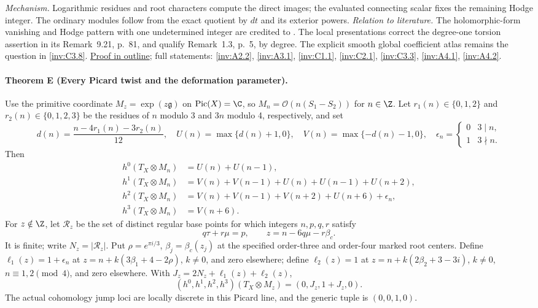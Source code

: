 \textit{Mechanism.} Logarithmic residues and root characters
compute the direct images; the evaluated connecting scalar fixes
the remaining Hodge integer.  The ordinary modules follow from
the exact quotient by $dt$ and its exterior powers.
\textit{Relation to literature.} The holomorphic-form vanishing
and Hodge pattern with one undetermined integer are credited to
\cite[Theorem~9.1(vi), p.~65; Proposition~9.20, p.~80]{AC2026}.
The local presentations correct the degree-one torsion assertion
in its Remark~9.21, p.~81, and qualify Remark~1.3, p.~5, by
degree.  The explicit smooth global coefficient atlas remains the
question in \ref{inv:C3.8}.
\hyperlink{outline-I-D}{Proof in outline}; full statements:
\ref{inv:A2.2}, \ref{inv:A3.1}, \ref{inv:C1.1},
\ref{inv:C2.1}, \ref{inv:C3.3}, \ref{inv:A4.1},
\ref{inv:A4.2}.

\hypertarget{main-I-E}{}
\paragraph{Theorem E (Every Picard twist and the deformation parameter).}
\label{series:I:E}
Use the primitive coordinate $M_z=\exp(z\mathfrak g)$ on
$\operatorname{Pic}(X)=\C$, so
$M_n=\mathcal O(n(S_1-S_2))$ for $n\in\Z$.
Let $r_1(n)\in\{0,1,2\}$ and $r_2(n)\in\{0,1,2,3\}$ be the
residues of $n$ modulo 3 and $3n$ modulo 4, respectively, and set
\[
 d(n)=\frac{n-4r_1(n)-3r_2(n)}{12},\quad
 U(n)=\max\{d(n)+1,0\},\quad V(n)=\max\{-d(n)-1,0\},
 \quad\epsilon_n=\begin{cases}0&3\mid n,\\1&3\nmid n.\end{cases}
\]
Then
\[
\begin{aligned}
h^0(T_X\otimes M_n)&=U(n)+U(n-1),\\
h^1(T_X\otimes M_n)&=V(n)+V(n-1)+U(n)+U(n-1)+U(n+2),\\
h^2(T_X\otimes M_n)&=V(n)+V(n-1)+V(n+2)+U(n+6)+\epsilon_n,\\
h^3(T_X\otimes M_n)&=V(n+6).
\end{aligned}
\]
For $z\notin\Z$, let $\mathcal R_z$ be the set of distinct
regular base points for which integers $n,p,q,r$ satisfy
\[
 q\tau+r\mu=p,\qquad z=n-6q\mu-r\beta_c.
\]
It is finite; write $N_z=|\mathcal R_z|$.  Put
$\rho=e^{\pi i/3}$, $\beta_j=\beta_c(z_j)$ at the specified
order-three and order-four marked root centers.  Define
$\ell_1(z)=1+\epsilon_n$ at
$z=n+k(3\beta_1+4-2\rho)$, $k\ne0$, and zero elsewhere;
define $\ell_2(z)=1$ at
$z=n+k(2\beta_2+3-3i)$, $k\ne0$, $n\equiv1,2\pmod4$,
and zero elsewhere.  With
$J_z=2N_z+\ell_1(z)+\ell_2(z)$,
\[
 (h^0,h^1,h^2,h^3)(T_X\otimes M_z)=(0,J_z,1+J_z,0).
\]
The actual cohomology jump loci are locally discrete in this
Picard line, and the generic tuple is $(0,0,1,0)$.

